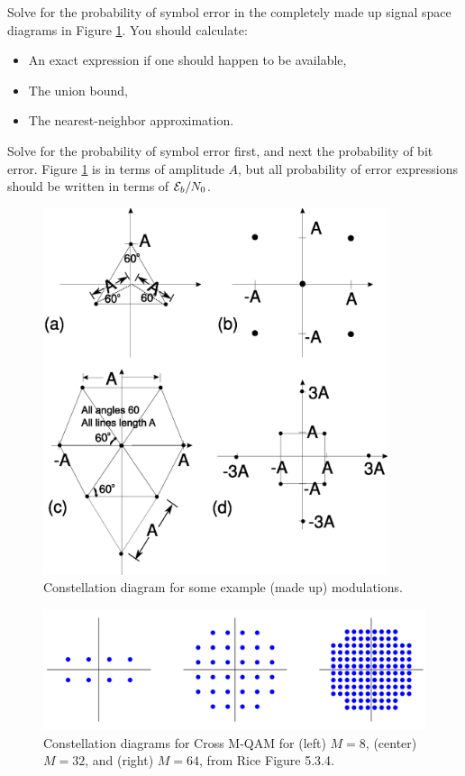 Solve for the probability of symbol error in the completely made up signal space diagrams in
Figure \ref{F:exampleQAM-PSK-diagrams}.  You should calculate:
\begin{itemize}
  \item An exact expression if one should happen to be available,
  \item The union bound,
  \item The nearest-neighbor approximation.
\end{itemize}
Solve for the probability of symbol error first, and next the probability of
bit error.  Figure \ref{F:exampleQAM-PSK-diagrams} is in terms of amplitude $A$, but all
probability of error expressions should be written in terms of
$\mathcal{E}_b/N_0$.

\begin{figure}[htbp]
  \includegraphics[width=0.9\textwidth]{../images/EgQAM_v2.eps}
  \caption{Constellation diagram for some example (made up) modulations.
  \label{F:exampleQAM-PSK-diagrams}}
\end{figure}
\begin{figure}[htbp]
  \includegraphics[width=1.0\textwidth]{../images/cross_mqam_8_32_64.png}
  \caption{Constellation diagrams for Cross M-QAM for (left) $M=8$, (center) $M=32$, and (right) $M=64$, from Rice Figure 5.3.4.
  \label{F:exampleCrossQAM}}
\end{figure}

